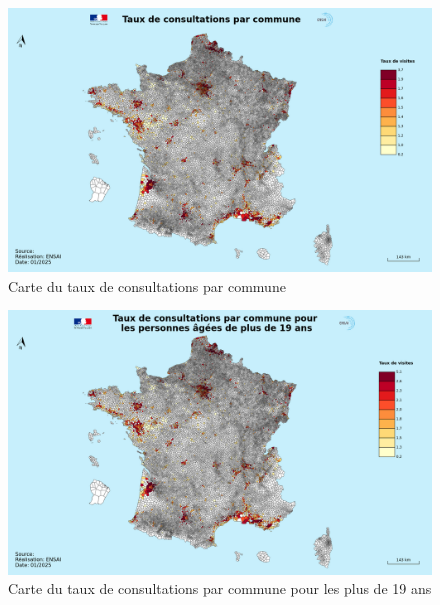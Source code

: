 \documentclass[
]{article}
\begin{document}
\begin{figure}
    \centering
    \includegraphics[width=1\linewidth]{../cartes/taux_de_consultations}
    \caption{Carte du taux de consultations par commune}
    \label{fig:figure}
\end{figure}

\begin{figure}
    \centering
    \includegraphics[width=1\linewidth]{../cartes/taux_de_consultations_plus_19_ans}
    \caption{Carte du taux de consultations par commune pour les plus de 19 ans}
    \label{fig:figure}
\end{figure}
\end{document}
